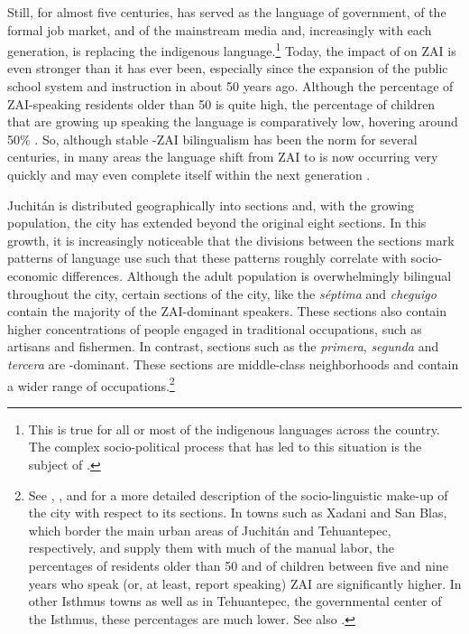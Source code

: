 \largerpage[-1]
Still, for almost five centuries,  has served as the language of government, of the formal job market, and of the mainstream media and, increasingly with each generation, is replacing the indigenous language.\footnote{This is true for all or most of the indigenous languages across the country. The complex socio-political process that has led to this situation is the subject of \citet{heath1972}.}  Today, the impact of  on ZAI is even stronger than it has ever been, especially since the expansion of the public school system and instruction in  about 50 years ago. Although the percentage of ZAI-speaking residents older than 50 is quite high, the percentage of children that are growing up speaking the language is comparatively low, hovering around 50\% \citep{augsburger2004}. So, although stable -ZAI bilingualism has been the norm for several centuries, in many areas the language shift from ZAI to  is now occurring very quickly and may even complete itself within the next generation \citep{augsburger2004}.

Juchit\'{a}n is distributed geographically into sections and, with the growing population, the city has extended beyond the original eight sections. In this growth, it is increasingly noticeable that the divisions between the sections mark patterns of language use such that these patterns roughly correlate with socio-economic differences.  Although the adult population is overwhelmingly bilingual throughout the city, certain sections of the city, like the \textit{s\'{e}ptima} and \textit{cheguigo} contain the majority of the ZAI-dominant speakers. These sections also contain higher concentrations of people engaged in traditional occupations, such as artisans and fishermen. In contrast, sections such as the \textit{primera},  \textit{segunda} and  \textit{tercera} are -dominant. These sections are middle-class neighborhoods and contain a wider range of occupations.\footnote{See \citet{saynes2002}, \citet{augsburger2004}, and \citet[Chapter 1]{mccomsey2015} for a more detailed description of the socio-linguistic make-up of the city with respect to its sections. In towns such as Xadani and San Blas, which border the main urban areas of Juchit\'{a}n and Tehuantepec, respectively, and supply them with much of the manual labor, the percentages of residents older than 50 and of children between five and nine years who speak (or, at least, report speaking) ZAI are significantly higher. In other Isthmus towns as well as in Tehuantepec, the governmental center of the Isthmus, these percentages are much lower. See also \citet{toledo2018}.} 

